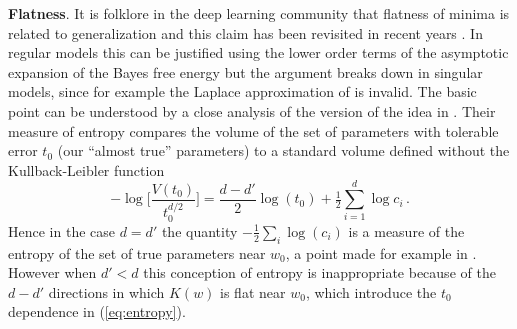 \documentclass{article} %
\begin{document}
\textbf{Flatness}. It is folklore in the deep learning community that flatness of minima is related to generalization \citep{hinton_keeping_1993, hochreiter1997flat} and this claim has been revisited in recent years \citep{chaudhari2019entropy, smith2017bayesian, jastrzkebski2017three, zhang_energyentropy_2018}. In regular models this can be justified using the lower order terms of the asymptotic expansion of the Bayes free energy \citep[\S 3.1]{Balasubramanian:1996cond.mat..1030B} but the argument breaks down in singular models, since for example the Laplace approximation of \cite{zhang_energyentropy_2018} is invalid. The basic point can be understood by a close analysis of the version of the idea in \citep{hochreiter1997flat}. Their measure of entropy compares the volume of the set of parameters with tolerable error $t_0$ (our ``almost true'' parameters) to a standard volume defined without the Kullback-Leibler function
\begin{equation}\label{eq:entropy}
- \log\Big[\frac{V(t_0)}{t_0^{d/2}}\Big] = \frac{d-d'}{2} \log(t_0) + \tfrac{1}{2} \sum_{i=1}^{d} \log c_i\,.
\end{equation}
Hence in the case $d = d'$ the quantity $-\tfrac{1}{2} \sum_i \log(c_i)$ is a measure of the entropy of the set of true parameters near $w_0$, a point made for example in \cite{zhang_energyentropy_2018}. However when $d' < d$ this conception of entropy is inappropriate because of the $d - d'$ directions in which $K(w)$ is flat near $w_0$, which introduce the $t_0$ dependence in (\ref{eq:entropy}). %

\end{document}
